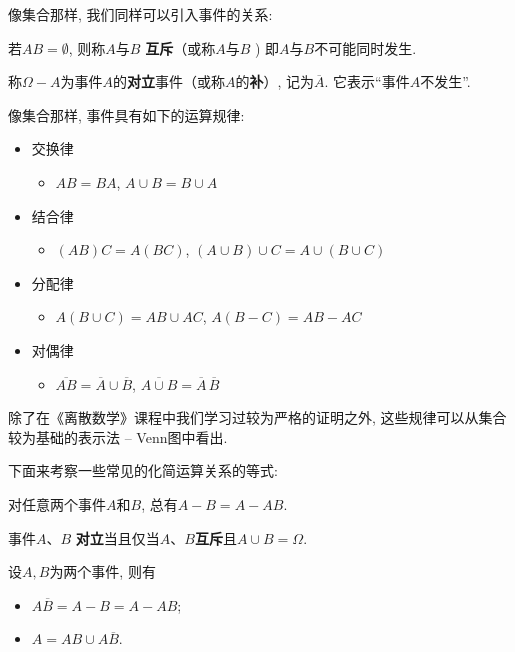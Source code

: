 像集合那样, 我们同样可以引入事件的关系:

\begin{definition}
    若$AB=\emptyset$, 则称$A$与$B$ \textbf{互斥}（或称$A$与$B$ )
    即$A$与$B$不可能同时发生.
\end{definition}

\begin{definition}
    称$\Omega-A$为事件$A$的\textbf{对立}事件（或称$A$的\textbf{补}）, 记为$\overline{A}$.
    它表示``事件$A$不发生''.
\end{definition}


像集合那样, 事件具有如下的运算规律:
\begin{itemize}
    \item 交换律
          \begin{itemize}
              \item $AB=BA$, $A\cup B=B\cup A$
          \end{itemize}
    \item 结合律
          \begin{itemize}
              \item $(AB)C=A(BC)$, $(A\cup B)\cup C=A\cup(B\cup C)$
          \end{itemize}
    \item 分配律
          \begin{itemize}
              \item $A(B\cup C)=AB\cup AC$, $A(B-C)=AB-AC$
          \end{itemize}
    \item 对偶律
          \begin{itemize}
              \item $\overline{AB}=\overline{A}\cup\overline{B}$, $\overline{A\cup B}=\overline{A}\,\overline{B}$
          \end{itemize}
\end{itemize}
除了在《离散数学》课程中我们学习过较为严格的证明之外, 这些规律可以从集合较为基础的表示法 -- Venn图中看出. 

下面来考察一些常见的化简运算关系的等式:

\begin{proposition}
    对任意两个事件$A$和$B$, 总有$ A-B=A-AB$.
\end{proposition}


\begin{proposition}
    事件$A$、$B$ \textbf{对立}当且仅当$A$、$B$\textbf{互斥}且$A\cup B=\Omega$.
\end{proposition}
\begin{example}
    设$A,B$为两个事件, 则有
    \begin{itemize}
        \item $A\overline{B}=A-B=A-AB$;
        \item $A=AB\cup A\overline{B}$.
    \end{itemize}
\end{example}

